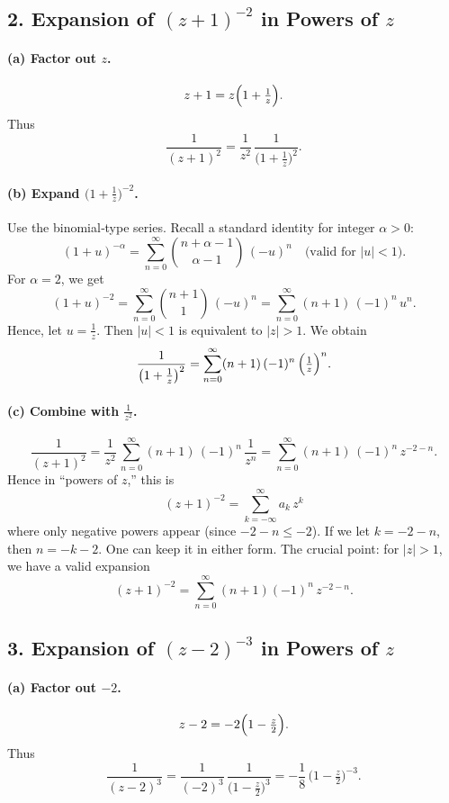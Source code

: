 \documentclass[12pt]{article}
\theoremstyle{definition} %
\theoremstyle{plain} %
\begin{document}
\bigskip

\subsection*{2. Expansion of \((z+1)^{-2}\) in Powers of \(z\)}

\paragraph{(a) Factor out \(z\).}
\[
z+1 
= z\Bigl(1 + \tfrac{1}{z}\Bigr).
\]
Thus
\[
\frac{1}{(z+1)^2}
= \frac{1}{z^2}\,\frac{1}{\bigl(1+\tfrac{1}{z}\bigr)^2}.
\]

\paragraph{(b) Expand \(\bigl(1 + \tfrac{1}{z}\bigr)^{-2}\).}
Use the binomial‐type series.  Recall a standard identity for integer \(\alpha>0\):
\[
(1+u)^{-\alpha}
= \sum_{n=0}^\infty \binom{n+\alpha-1}{\alpha-1}\,(-u)^n
\quad\text{(valid for }|u|<1\text{).}
\]
For \(\alpha=2\), we get
\[
(1+u)^{-2}
= \sum_{n=0}^\infty \binom{n+1}{1}\,(-u)^n
= \sum_{n=0}^\infty (n+1)\,(-1)^n\,u^n.
\]
Hence, let \(u=\tfrac{1}{z}\). Then \(\bigl|u\bigr|<1\) is equivalent to \(|z|>1\). We obtain
\[
\frac{1}{\bigl(1+\tfrac{1}{z}\bigr)^2}
= \sum_{n=0}^\infty (n+1)\,(-1)^n \,\Bigl(\tfrac{1}{z}\Bigr)^n.
\]

\paragraph{(c) Combine with \(\tfrac{1}{z^2}\).}
\[
\frac{1}{(z+1)^2}
= \frac{1}{z^2}\,\sum_{n=0}^\infty (n+1)\,(-1)^n\,\frac{1}{z^n}
= \sum_{n=0}^\infty (n+1)\,(-1)^n \,z^{-2-n}.
\]
Hence in “powers of \(z\),” this is
\[
(z+1)^{-2} 
= \sum_{k=-\infty}^{\infty} a_k\,z^k
\]
where only negative powers appear (since \(-2-n \le -2\)).  If we let \(k=-2-n\), then \(n=-k-2\).  One can keep it in either form.  The crucial point: for \(|z|>1\), we have a valid expansion
\[
(z+1)^{-2} = \sum_{n=0}^\infty (n+1)(-1)^n\,z^{-2-n}.
\]

\bigskip

\subsection*{3. Expansion of \((z-2)^{-3}\) in Powers of \(z\)}

\paragraph{(a) Factor out \(-2\).}
\[
z - 2
= -2\Bigl(1 - \tfrac{z}{2}\Bigr).
\]
Thus
\[
\frac{1}{(z-2)^3}
= \frac{1}{(-2)^3}\,\frac{1}{\bigl(1 - \tfrac{z}{2}\bigr)^3}
= -\frac{1}{8}\,\bigl(1 - \tfrac{z}{2}\bigr)^{-3}.
\]
\end{document}
